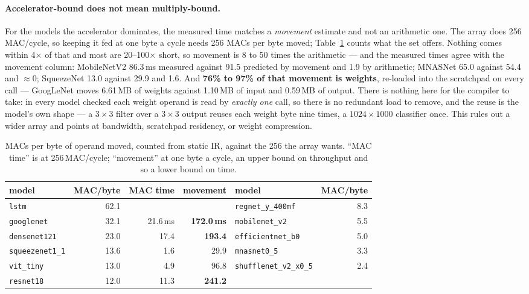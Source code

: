 \documentclass[runningheads]{llncs}
\begin{document}
\paragraph{Accelerator-bound does not mean multiply-bound.} For the models the
accelerator dominates, the measured time matches a \emph{movement} estimate and not
an arithmetic one. The array does 256\,MAC/cycle, so keeping it fed at one byte a
cycle needs 256 MACs per byte moved; Table~\ref{tab:roofline} counts what the set
offers. Nothing comes within 4$\times$ of that and most are 20--100$\times$ short,
so movement is 8 to 50 times the arithmetic --- and the measured times agree with
the movement column: MobileNetV2 86.3\,ms measured against 91.5 predicted by
movement and 1.9 by arithmetic; MNASNet 65.0 against 54.4 and $\approx$0;
SqueezeNet 13.0 against 29.9 and 1.6. And \textbf{76\% to 97\% of that movement is
weights}, re-loaded into the scratchpad on every call --- GoogLeNet moves 6.61\,MB
of weights against 1.10\,MB of input and 0.59\,MB of output. There is nothing here for the
compiler to take: in every model checked each weight operand is read by
\emph{exactly one} call, so there is no redundant load to remove, and the reuse is
the model's own shape --- a $3{\times}3$ filter over a $3{\times}3$ output reuses
each weight byte nine times, a $1024{\times}1000$ classifier once. This rules out a
wider array and points at bandwidth, scratchpad residency, or weight compression.

\begin{table}[t]
\caption{MACs per byte of operand moved, counted from static IR, against the 256
the array wants. ``MAC time'' is at 256\,MAC/cycle; ``movement'' at one byte a
cycle, an upper bound on throughput and so a lower bound on
time.}\label{tab:roofline}
\centering
\footnotesize
\begin{tabular}{|l|r|r|r||l|r|}
\hline
model & MAC/byte & MAC time & movement & model & MAC/byte \\
\hline
\texttt{lstm} & 62.1 & & & \texttt{regnet\_y\_400mf} & 8.3 \\
\texttt{googlenet} & 32.1 & 21.6\,ms & \textbf{172.0\,ms} & \texttt{mobilenet\_v2} & 5.5 \\
\texttt{densenet121} & 23.0 & 17.4 & \textbf{193.4} & \texttt{efficientnet\_b0} & 5.0 \\
\texttt{squeezenet1\_1} & 13.6 & 1.6 & 29.9 & \texttt{mnasnet0\_5} & 3.3 \\
\texttt{vit\_tiny} & 13.0 & 4.9 & 96.8 & \texttt{shufflenet\_v2\_x0\_5} & 2.4 \\
\texttt{resnet18} & 12.0 & 11.3 & \textbf{241.2} & & \\
\hline
\end{tabular}
\end{table}
\end{document}
